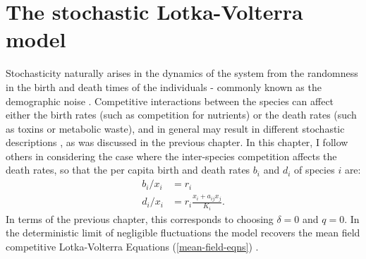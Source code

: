 

\section{The stochastic Lotka-Volterra model}
Stochasticity naturally arises in the dynamics of the system from the randomness in the birth and death times of the individuals - commonly known as the demographic noise \cite{VanKampen1992,Elgart2004a,Parker2009,Assaf2006}. 
Competitive interactions between the species can affect either the birth rates (such as competition for nutrients) or the death rates (such as toxins or metabolic waste), and in general may result in different stochastic descriptions \cite{Allen2003a,Badali2018}, as was discussed in the previous chapter. 
In this chapter, I follow others \cite{Lin2012,Gabel2013,Constable2015} in considering the case where the inter-species competition affects the death rates, so that the per capita birth and death rates $b_i$ and $d_i$ of species $i$ are:
\begin{equation}
\begin{aligned}
b_i/x_i &= r_i \\
d_i/x_i &= r_i\frac{x_i+a_{ij}x_j}{K_i}.  \label{deathrate}
\end{aligned}
\end{equation}
In terms of the previous chapter, this corresponds to choosing $\delta = 0$ and $q=0$. 
In the deterministic limit of negligible fluctuations the model recovers the mean field competitive Lotka-Volterra Equations (\ref{mean-field-eqns}) \cite{Lin2012}. 

